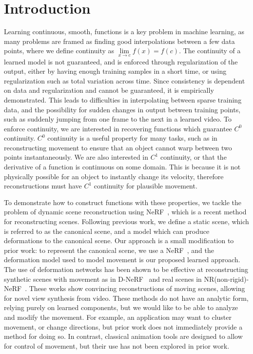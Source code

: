 \section*{Introduction}

Learning continuous, smooth, functions is a key problem in machine learning, as many problems
are framed as finding good interpolations between a few data points, where we define continuity as $\lim\limits_{x\to c}f(x) = f(c)$.
The continuity of a learned model is not guaranteed, and is enforced through regularization of the output, either by having enough training samples in a short time, or
using regularization such as total variation across time. Since consistency is dependent on data and regularization and cannot be guaranteed, it is empirically demonstrated. This leads to difficulties in interpolating between sparse training data, and the possibility for sudden changes in output between training points, such as suddenly jumping from one frame to the next in a learned video.
To enforce continuity, we are interested in recovering functions which guarantee $C^0$ continuity. $C^0$ continuity is a useful property for many tasks, such as in reconstructing movement to ensure that an object cannot warp between two points instantaneously. We are also interested in $C^1$ continuity, or that the derivative of a function is continuous on some domain. This is because it is not physically possible for an object to instantly change its velocity, therefore reconstructions must have $C^1$ continuity for plausible movement.

To demonstrate how to construct functions with these properties, we tackle the problem of dynamic scene reconstruction using NeRF~\cite{mildenhall2020nerf}, which is a recent method for reconstructing scenes. Following previous work, we define a static scene, which is referred to as the canonical scene, and a model which can produce deformations to the canonical scene. Our approach is a small modification to prior work: to represent the canonical scene, we use a NeRF~\cite{mildenhall2020nerf}, and the deformation model used to model movement is our proposed learned approach. The use of deformation networks has been shown to be effective at reconstructing synthetic scenes with movement as in D-NeRF~\cite{pumarola2020dnerf} and real scenes in NR(non-rigid)-NeRF~\cite{tretschk2021nonrigid}. These works show convincing
reconstructions of moving scenes, allowing for novel view synthesis from video. These methods do not have an analytic form, relying purely on learned components, but we would like to be able to analyze and modify the movement. For example, an application may want to cluster movement, or change directions, but prior work does not immediately provide a method for doing so. In contrast, classical animation tools are designed to allow for control of movement, but their use has not been explored in prior work.

